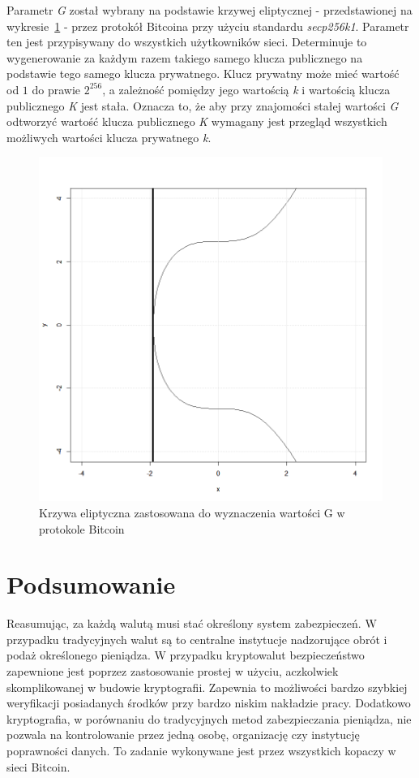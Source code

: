 \documentclass[12pt, oneside, final, openany]{mgr}
\begin{document}
\indent Parametr \textit{G} został wybrany na podstawie krzywej eliptycznej - przedstawionej na wykresie~\ref{fig:krzywaEliptyczna} - przez protokół Bitcoina przy użyciu standardu \textit{secp256k1}. Parametr ten jest przypisywany do wszystkich użytkowników sieci. Determinuje to wygenerowanie za każdym razem takiego samego klucza publicznego na podstawie tego samego klucza prywatnego. Klucz prywatny może mieć wartość od $1$ do prawie $2^{256}$, a zależność pomiędzy jego wartością \textit{k} i wartością klucza publicznego \textit{K} jest stała. Oznacza to, że aby przy znajomości stałej wartości \textit{G} odtworzyć wartość klucza publicznego \textit{K} wymagany jest przegląd wszystkich możliwych wartości klucza prywatnego \textit{k}. 
\if@archive\else{\newpage}\fi
\vfill
\begin{figure}[!h]
\centering
\includegraphics[width=0.9\linewidth]{pictures/elliptic.png}
\caption{Krzywa eliptyczna zastosowana do wyznaczenia wartości G w protokole Bitcoin}
\label{fig:krzywaEliptyczna}
\end{figure}

\section{Podsumowanie} \label{sec:podsumowanieKryptowaluty}
\indent Reasumując, za każdą walutą musi stać określony system zabezpieczeń. W przypadku tradycyjnych walut są to centralne instytucje nadzorujące obrót i podaż określonego pieniądza. W przypadku kryptowalut bezpieczeństwo zapewnione jest poprzez zastosowanie prostej w użyciu, aczkolwiek skomplikowanej w budowie kryptografii. Zapewnia to możliwości bardzo szybkiej weryfikacji posiadanych środków przy bardzo niskim nakładzie pracy. Dodatkowo kryptografia, w porównaniu do tradycyjnych metod zabezpieczania pieniądza, nie pozwala na kontrolowanie przez jedną osobę, organizację czy instytucję poprawności danych. To zadanie wykonywane jest przez wszystkich kopaczy w sieci Bitcoin. 
\end{document}
